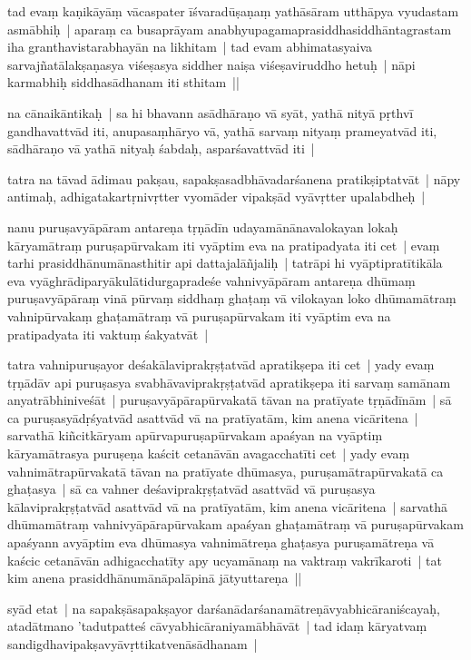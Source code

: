 \documentclass[article,12pt,a4paper]{memoir}
\begin{document}
	  \pstart tad evaṃ kaṇikāyāṃ vācaspater īśvaradūṣaṇaṃ yathāsāram utthāpya vyudastam asmābhiḥ | aparaṃ ca busaprāyam anabhyupagamaprasiddhasiddhāntagrastam iha granthavistarabhayān na likhitam | tad evam abhimatasyaiva sarvajñatālakṣaṇasya viśeṣasya siddher naiṣa viśeṣaviruddho hetuḥ | nāpi karmabhiḥ siddhasādhanam iti sthitam || 
	\pend
      

	  \pstart {}\label{thakur75-36.21} na cānaikāntikaḥ | sa hi bhavann asādhāraṇo vā syāt, yathā nityā pṛthvī gandhavattvād iti, anupasaṃhāryo vā, yathā sarvaṃ nityaṃ prameyatvād iti, sādhāraṇo vā yathā nityaḥ śabdaḥ, asparśavattvād iti |
	\pend
      

	  \pstart tatra na tāvad ādimau pakṣau, sapakṣasadbhāvadarśanena pratikṣiptatvāt | nāpy antimaḥ, adhigatakartṛnivṛtter vyomāder vipakṣād vyāvṛtter upalabdheḥ | 
	\pend
      

	  \pstart nanu puruṣavyāpāram antareṇa tṛṇādīn udayamānānavalokayan lokaḥ kāryamātraṃ puruṣapūrvakam iti vyāptim eva na pratipadyata iti cet | evaṃ tarhi prasiddhānumānasthitir api dattajalāñjaliḥ | tatrāpi hi vyāptipratītikāla eva vyāghrā\leavevmode{}\label{RNAms_21a}diparyākulātidurgapradeśe vahnivyāpāram antareṇa dhūmaṃ puruṣavyāpāraṃ vinā pūrvaṃ siddhaṃ ghaṭaṃ vā vilokayan loko dhūmamātraṃ vahnipūrvakaṃ ghaṭamātraṃ vā puruṣapūrvakam iti vyāptim eva na pratipadyata iti vaktuṃ śakyatvāt |
	\pend
      

	  \pstart tatra vahnipuruṣayor deśakālaviprakṛṣṭatvād apratikṣepa iti cet | yady evaṃ tṛṇādāv api puruṣasya svabhāvaviprakṛṣṭatvād apratikṣepa iti sarvaṃ samānam anyatrābhiniveśāt | puruṣavyāpārapūrvakatā tāvan na pratīyate tṛṇādīnām | sā ca puruṣasyādṛśyatvād asattvād vā na pratīyatām, kim anena vicāritena | sarvathā kiñcitkāryam apūrvapuruṣapūrvakam apaśyan na vyāptiṃ kāryamātrasya puruṣeṇa kaścit cetanāvān avagacchatīti cet | yady evaṃ vahnimātrapūrvakatā tāvan na pratīyate dhūmasya, puruṣamātrapūrvakatā ca ghaṭasya | sā ca vahner deśaviprakṛṣṭatvād asattvād vā puruṣasya kālaviprakṛṣṭatvād asattvād vā na pratīyatām, kim anena vicāritena | sarvathā dhūmamātraṃ vahnivyāpārapūrvakam apaśyan ghaṭamātraṃ vā puruṣapūrvakam apaśyann avyāptim eva dhūmasya vahnimātreṇa ghaṭasya puruṣamātreṇa vā kaścic cetanāvān adhigacchatīty apy ucyamānaṃ na vaktraṃ vakrīkaroti | tat kim anena prasiddhānumānāpalāpinā jātyuttareṇa ||
	\pend
      

	  \pstart {}\label{rnā__96541}syād etat | na sapakṣāsapakṣayor darśanādarśanamātreṇāvyabhicāraniścayaḥ, atadātmano 'tadutpatteś cāvyabhicāraniyamābhāvāt | tad idaṃ kāryatvaṃ sandigdhavipakṣavyāvṛttikatvenāsādhanam |
	\pend
      
\end{document}
